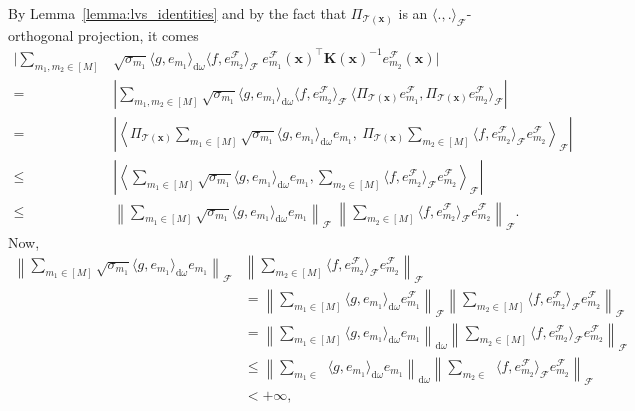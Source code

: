 \documentclass[twoside,11pt]{book}
\numberwithin{theorem}{chapter}
\numberwithin{definition}{chapter}
\numberwithin{proposition}{chapter}
\numberwithin{corollary}{chapter}
\numberwithin{example}{chapter}
\numberwithin{lemma}{chapter}
\DeclareMathOperator{\Tran}{\intercal}
\DeclareMathOperator{\F}{\mathcal{F}}
\DeclareMathOperator{\Ns}{\mathbb{N}^{*}}
\begin{document}
By Lemma~\ref{lemma:lvs_identities} and by the fact that $\Pi_{\mathcal{T}(\bm{x})}$ is an $\langle.,.\rangle_{\F}$-orthogonal projection, it comes
\begin{align}
\Bigg|\sum_{m_{1}, m_2 \in [M]} &\sqrt{\sigma_{m_{1}}} \langle g, e_{m_{1}} \rangle_{\mathrm{d}\omega} \langle f, e_{m_{2}}^{\F} \rangle_{\F}  \: e_{m_{1}}^{\F}(\bm{x})^{\Tran} \bm{K}(\bm{x})^{-1}e_{m_{2}}^{\F}(\bm{x}) \Bigg| \\
= & \left|\sum_{m_{1}, m_2 \in [M]} \sqrt{\sigma_{m_{1}}} \langle g, e_{m_{1}} \rangle_{\mathrm{d}\omega}  \langle f, e_{m_{2}}^{\F} \rangle_{\F}  \: \langle \Pi_{\mathcal{T}(\bm{x})}e_{m_{1}}^{\F}, \Pi_{\mathcal{T}(\bm{x})}e_{m_{2}}^{\F} \rangle_{\F} \right|\\
= & \left| \left\langle \Pi_{\mathcal{T}(\bm{x})} \sum\limits_{m_{1} \in [M] }  \sqrt{\sigma_{m_{1}}} \langle g, e_{m_{1}} \rangle_{\mathrm{d}\omega}   e_{m_{1}},\:  \Pi_{\mathcal{T}(\bm{x})} \sum\limits_{m_{2} \in [M]} \langle f, e_{m_{2}}^{\F} \rangle_{\F} e_{m_{2}}^{\F} \right\rangle_{\F} \right|\\
\leq & \left| \left\langle \sum\limits_{m_{1} \in [M] }  \sqrt{\sigma_{m_{1}}} \langle g, e_{m_{1}} \rangle_{\mathrm{d}\omega}   e_{m_{1}},  \sum\limits_{m_{2} \in [M]} \langle f, e_{m_{2}}^{\F} \rangle_{\F} e_{m_{2}}^{\F} \right\rangle_{\F} \right|\\
\leq & \left\| \sum\limits_{m_{1} \in [M] }  \sqrt{\sigma_{m_{1}}} \langle g, e_{m_{1}} \rangle_{\mathrm{d}\omega}   e_{m_{1}} \right\|_{\F}\: \left \| \sum\limits_{m_{2} \in [M]} \langle f, e_{m_{2}}^{\F} \rangle_{\F} e_{m_{2}}^{\F} \right\|_{\F}.
\end{align}
Now,
\begin{align}
\left\| \sum\limits_{m_{1} \in [M] }  \sqrt{\sigma_{m_{1}}} \langle g, e_{m_{1}} \rangle_{\mathrm{d}\omega}   e_{m_{1}} \right\|_{\F}  & \left \| \sum\limits_{m_{2} \in [M]} \langle f, e_{m_{2}}^{\F} \rangle_{\F} e_{m_{2}}^{\F} \right\|_{\F}\\
&  = \left\| \sum\limits_{m_{1} \in [M] }  \langle g, e_{m_{1}} \rangle_{\mathrm{d}\omega}   e_{m_{1}}^{\F} \right\|_{\F} \left \| \sum\limits_{m_{2} \in [M]} \langle f, e_{m_{2}}^{\F} \rangle_{\F} e_{m_{2}}^{\F} \right\|_{\F}\\
&  = \left\| \sum\limits_{m_{1} \in [M] }  \langle g, e_{m_{1}} \rangle_{\mathrm{d}\omega}   e_{m_{1}} \right\|_{\mathrm{d}\omega} \left \| \sum\limits_{m_{2} \in [M]} \langle f, e_{m_{2}}^{\F} \rangle_{\F} e_{m_{2}}^{\F} \right\|_{\F}\\
&  \leq \left\| \sum\limits_{m_{1} \in \Ns }  \langle g, e_{m_{1}} \rangle_{\mathrm{d}\omega}   e_{m_{1}} \right\|_{\mathrm{d}\omega} \left \| \sum\limits_{m_{2} \in \Ns} \langle f, e_{m_{2}}^{\F} \rangle_{\F} e_{m_{2}}^{\F} \right\|_{\F}\\
& < +\infty,
\end{align}
\end{document}
